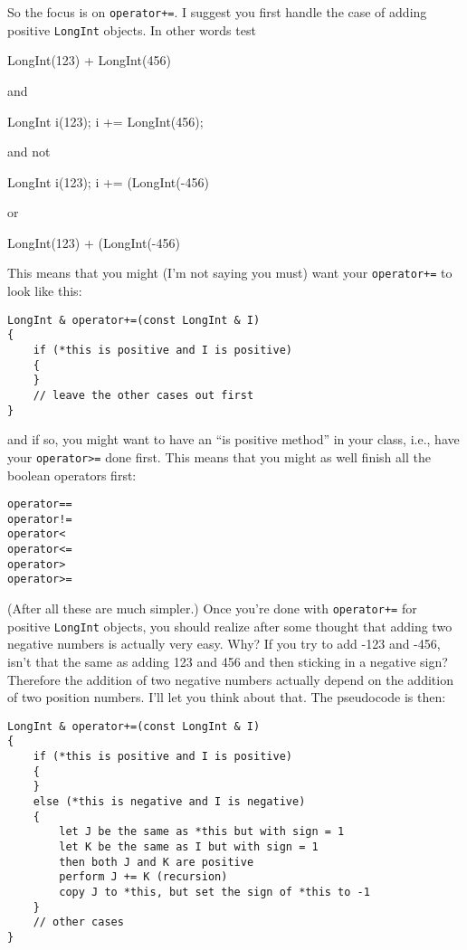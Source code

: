 So the focus is on \verb!operator+=!. I suggest you first handle the case 
of adding positive \verb!LongInt! objects. In other words test 
\begin{console}[fontsize=\footnotesize]
LongInt(123) + LongInt(456)
\end{console}
and
\begin{console}[fontsize=\footnotesize]
LongInt i(123);
i += LongInt(456); 
\end{console}
and not 
\begin{console}[fontsize=\footnotesize]
LongInt i(123);
i += (LongInt(-456)
\end{console}
or
\begin{console}[fontsize=\footnotesize]
LongInt(123) + (LongInt(-456)
\end{console}

This means that you might (I'm not 
saying you must) want your \verb!operator+=! to look like this:

\begin{Verbatim}[frame=single,fontsize=\footnotesize]
LongInt & operator+=(const LongInt & I)
{
    if (*this is positive and I is positive)
    {
    }
    // leave the other cases out first
}
\end{Verbatim}
and if so, you might want to have an “is positive method” in your class, 
i.e., have your \verb!operator>=! done first. This means that you might 
as well finish all the boolean operators first:
\begin{Verbatim}[frame=single,fontsize=\footnotesize]
operator==
operator!=
operator<
operator<=
operator>
operator>=
\end{Verbatim}
(After all these are much simpler.)
Once you're done with \verb!operator+=! for positive \verb!LongInt! objects, 
you should realize after some thought that adding two negative numbers is 
actually very easy. Why? If you try to add -123 and -456, isn't that the same 
as adding 123 and 456 and then sticking in a negative sign? Therefore the addition 
of two negative numbers actually depend on the addition of two position numbers. 
I'll let you think about that.
The pseudocode is then:
\begin{Verbatim}[frame=single,fontsize=\footnotesize]
LongInt & operator+=(const LongInt & I)
{
    if (*this is positive and I is positive)
    {
    }
    else (*this is negative and I is negative)
    {
        let J be the same as *this but with sign = 1
        let K be the same as I but with sign = 1
        then both J and K are positive
        perform J += K (recursion)
        copy J to *this, but set the sign of *this to -1
    }
    // other cases
}
\end{Verbatim}

